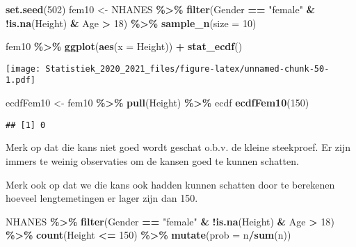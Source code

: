 \documentclass[
  12pt,dutch,coursenotes]{book}
\newenvironment{Shaded}{\begin{snugshade}}{\end{snugshade}}
\newcommand{\DataTypeTok}[1]{\textcolor[rgb]{0.13,0.29,0.53}{#1}}
\newcommand{\DecValTok}[1]{\textcolor[rgb]{0.00,0.00,0.81}{#1}}
\newcommand{\KeywordTok}[1]{\textcolor[rgb]{0.13,0.29,0.53}{\textbf{#1}}}
\newcommand{\NormalTok}[1]{#1}
\newcommand{\OperatorTok}[1]{\textcolor[rgb]{0.81,0.36,0.00}{\textbf{#1}}}
\newcommand{\StringTok}[1]{\textcolor[rgb]{0.31,0.60,0.02}{#1}}
\theoremstyle{definition}
\theoremstyle{definition}
\theoremstyle{definition}
\theoremstyle{remark}
\begin{document}
\begin{Shaded}
\begin{Highlighting}[]
\KeywordTok{set.seed}\NormalTok{(}\DecValTok{502}\NormalTok{)}
\NormalTok{fem10 \textless{}{-}}\StringTok{ }\NormalTok{NHANES }\OperatorTok{\%\textgreater{}\%}\StringTok{ }\KeywordTok{filter}\NormalTok{(Gender }\OperatorTok{==}\StringTok{ "female"} \OperatorTok{\&}\StringTok{ }\OperatorTok{!}\KeywordTok{is.na}\NormalTok{(Height) }\OperatorTok{\&}\StringTok{ }
\StringTok{    }\NormalTok{Age }\OperatorTok{\textgreater{}}\StringTok{ }\DecValTok{18}\NormalTok{) }\OperatorTok{\%\textgreater{}\%}\StringTok{ }\KeywordTok{sample\_n}\NormalTok{(}\DataTypeTok{size =} \DecValTok{10}\NormalTok{)}

\NormalTok{fem10 }\OperatorTok{\%\textgreater{}\%}\StringTok{ }\KeywordTok{ggplot}\NormalTok{(}\KeywordTok{aes}\NormalTok{(}\DataTypeTok{x =}\NormalTok{ Height)) }\OperatorTok{+}\StringTok{ }\KeywordTok{stat\_ecdf}\NormalTok{()}
\end{Highlighting}
\end{Shaded}

\texttt{[image: Statistiek\_2020\_2021\_files/figure-latex/unnamed-chunk-50-1.pdf]}

\begin{Shaded}
\begin{Highlighting}[]
\NormalTok{ecdfFem10 \textless{}{-}}\StringTok{ }\NormalTok{fem10 }\OperatorTok{\%\textgreater{}\%}\StringTok{ }\KeywordTok{pull}\NormalTok{(Height) }\OperatorTok{\%\textgreater{}\%}\StringTok{ }\NormalTok{ecdf}
\KeywordTok{ecdfFem10}\NormalTok{(}\DecValTok{150}\NormalTok{)}
\end{Highlighting}
\end{Shaded}

\begin{verbatim}
## [1] 0
\end{verbatim}

Merk op dat die kans niet goed wordt geschat o.b.v. de kleine steekproef. Er zijn immers te weinig observaties om de kansen goed te kunnen schatten.

Merk ook op dat we die kans ook hadden kunnen schatten door te berekenen hoeveel lengtemetingen er lager zijn dan 150.

\begin{Shaded}
\begin{Highlighting}[]
\NormalTok{NHANES }\OperatorTok{\%\textgreater{}\%}\StringTok{ }\KeywordTok{filter}\NormalTok{(Gender }\OperatorTok{==}\StringTok{ "female"} \OperatorTok{\&}\StringTok{ }\OperatorTok{!}\KeywordTok{is.na}\NormalTok{(Height) }\OperatorTok{\&}\StringTok{ }
\StringTok{    }\NormalTok{Age }\OperatorTok{\textgreater{}}\StringTok{ }\DecValTok{18}\NormalTok{) }\OperatorTok{\%\textgreater{}\%}\StringTok{ }\KeywordTok{count}\NormalTok{(Height }\OperatorTok{\textless{}=}\StringTok{ }\DecValTok{150}\NormalTok{) }\OperatorTok{\%\textgreater{}\%}\StringTok{ }\KeywordTok{mutate}\NormalTok{(}\DataTypeTok{prob =}\NormalTok{ n}\OperatorTok{/}\KeywordTok{sum}\NormalTok{(n))}
\end{Highlighting}
\end{Shaded}
\end{document}
